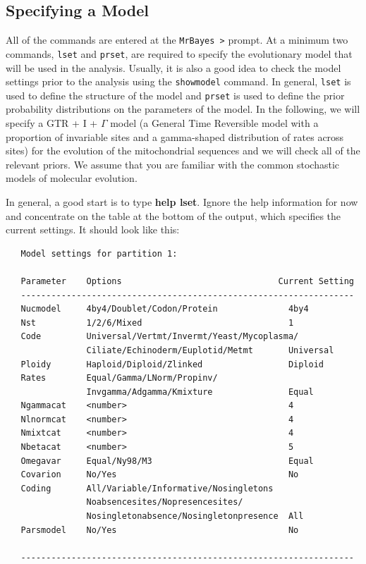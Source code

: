 \documentclass[12pt]{book}
\begin{document}
\subsection{Specifying a Model}
All of the commands are entered at the \texttt{MrBayes >} prompt. At a minimum two commands, \texttt{lset}
 and \texttt{prset}, are required to specify the evolutionary model that will be used in the analysis.
 Usually, it is also a good idea to check the model settings prior to the analysis using the 
 \texttt{showmodel} command. In general, \texttt{lset} is used to define the structure of the model and
 \texttt{prset} is used to define the prior probability distributions on the parameters of the model. In
 the following, we will specify a GTR + I + $\Gamma$ model (a General Time Reversible model with a proportion
 of invariable sites and a gamma-shaped distribution of rates across sites) for the evolution of the
 mitochondrial sequences and we will check all of the relevant priors. We assume that you are familiar with
 the common stochastic models of molecular evolution.

In general, a good start is to type \textbf{help lset}. Ignore the help information for now and concentrate
 on the table at the bottom of the output, which specifies the current settings. It should look like this:

\begin{singlespacing}
\small
\begin{verbatim}
   Model settings for partition 1:

   Parameter    Options                               Current Setting
   ------------------------------------------------------------------
   Nucmodel     4by4/Doublet/Codon/Protein              4by4
   Nst          1/2/6/Mixed                             1
   Code         Universal/Vertmt/Invermt/Yeast/Mycoplasma/
                Ciliate/Echinoderm/Euplotid/Metmt       Universal
   Ploidy       Haploid/Diploid/Zlinked                 Diploid
   Rates        Equal/Gamma/LNorm/Propinv/
                Invgamma/Adgamma/Kmixture               Equal
   Ngammacat    <number>                                4
   Nlnormcat    <number>                                4
   Nmixtcat     <number>                                4
   Nbetacat     <number>                                5
   Omegavar     Equal/Ny98/M3                           Equal
   Covarion     No/Yes                                  No
   Coding       All/Variable/Informative/Nosingletons
                Noabsencesites/Nopresencesites/
                Nosingletonabsence/Nosingletonpresence  All
   Parsmodel    No/Yes                                  No

   ------------------------------------------------------------------
\end{verbatim}
\normalsize
\end{singlespacing}
\end{document}
